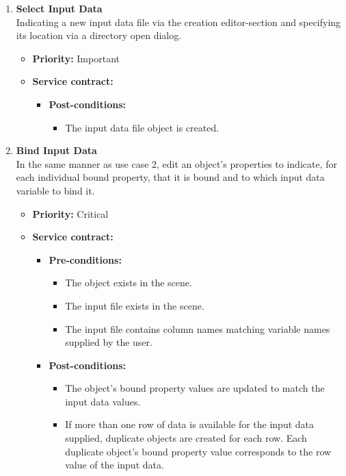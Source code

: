 \documentclass[a4paper,12pt]{article}
\begin{document}
\begin{enumerate}
			\item {\large \textbf{Select Input Data}}\\
			Indicating a new input data file via the creation editor-section and specifying its location via a directory open dialog.
			\begin{itemize}
				\item \textbf{Priority:} Important
				\item \textbf{Service contract:}
				\begin{itemize}
					\item \textbf{Post-conditions:}
						\begin{itemize}
							\item The input data file object is created.
						\end{itemize}
				\end{itemize}
			\end{itemize}
			
			\item {\large \textbf{Bind Input Data}}\\
			In the same manner as use case 2, edit an object's properties to indicate, for each individual bound property, that it is bound and to which input data variable to bind it. 
			\begin{itemize}
				\item \textbf{Priority:} Critical
				\item \textbf{Service contract:}
				\begin{itemize}
					\item \textbf{Pre-conditions:}
					\begin{itemize}
						\item The object exists in the scene.
						\item The input file exists in the scene.
						\item The input file contains column names matching variable names supplied by the user.
					\end{itemize}
					\item \textbf{Post-conditions:}
						\begin{itemize}
							\item The object's bound property values are updated to match the input data values.
							\item If more than one row of data is available for the input data supplied, duplicate objects are created for each row. Each duplicate object's bound property value corresponds to the row value of the input data.
						\end{itemize}
				\end{itemize}
			\end{itemize}
			

\end{enumerate}
\end{document}
